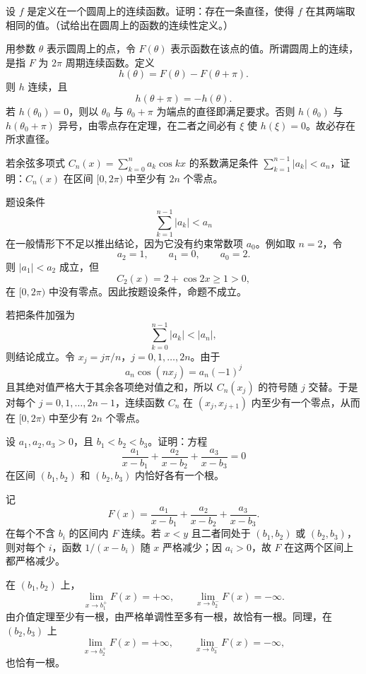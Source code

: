 \begin{xexercise}[2]
设 $f$ 是定义在一个圆周上的连续函数。证明：存在一条直径，使得 $f$ 在其两端取相同的值。（试给出在圆周上的函数的连续性定义。）
\end{xexercise}
\begin{xsolution}
用参数 $\theta$ 表示圆周上的点，令 $F(\theta)$ 表示函数在该点的值。所谓圆周上的连续，是指 $F$ 为 $2\pi$ 周期连续函数。定义
\[
 h(\theta)=F(\theta)-F(\theta+\pi).
\]
则 $h$ 连续，且
\[
 h(\theta+\pi)=-h(\theta).
\]
若 $h(\theta_0)=0$，则以 $\theta_0$ 与 $\theta_0+\pi$ 为端点的直径即满足要求。否则 $h(\theta_0)$ 与 $h(\theta_0+\pi)$ 异号，由零点存在定理，在二者之间必有 $\xi$ 使 $h(\xi)=0$。故必存在所求直径。
\end{xsolution}


\begin{xexercise}[3]
若余弦多项式 $C_n(x)=\sum_{k=0}^n a_k\cos kx$ 的系数满足条件 $\sum_{k=1}^{n-1}|a_k|<a_n$，证明：$C_n(x)$ 在区间 $[0,2\pi)$ 中至少有 $2n$ 个零点。
\end{xexercise}
\begin{xsolution}
题设条件
\[
 \sum_{k=1}^{n-1}|a_k|<a_n
\]
在一般情形下不足以推出结论，因为它没有约束常数项 $a_0$。例如取 $n=2$，令
\[
 a_2=1,\qquad a_1=0,\qquad a_0=2.
\]
则 $|a_1|<a_2$ 成立，但
\[
 C_2(x)=2+\cos2x\ge1>0,
\]
在 $[0,2\pi)$ 中没有零点。因此按题设条件，命题不成立。

若把条件加强为
\[
 \sum_{k=0}^{n-1}|a_k|<|a_n|,
\]
则结论成立。令 $x_j=j\pi/n$，$j=0,1,\ldots,2n$。由于
\[
 a_n\cos(nx_j)=a_n(-1)^j
\]
且其绝对值严格大于其余各项绝对值之和，所以 $C_n(x_j)$ 的符号随 $j$ 交替。于是对每个 $j=0,1,\ldots,2n-1$，连续函数 $C_n$ 在 $(x_j,x_{j+1})$ 内至少有一个零点，从而在 $[0,2\pi)$ 中至少有 $2n$ 个零点。
\end{xsolution}


\begin{xexercise}[4]
设 $a_1,a_2,a_3>0$，且 $b_1<b_2<b_3$。证明：方程
  \[
    \frac{a_1}{x-b_1}+\frac{a_2}{x-b_2}+\frac{a_3}{x-b_3}=0
  \]
  在区间 $(b_1,b_2)$ 和 $(b_2,b_3)$ 内恰好各有一个根。
\end{xexercise}
\begin{xsolution}
记
\[
 F(x)=\frac{a_1}{x-b_1}+\frac{a_2}{x-b_2}+\frac{a_3}{x-b_3}.
\]
在每个不含 $b_i$ 的区间内 $F$ 连续。若 $x<y$ 且二者同处于 $(b_1,b_2)$ 或 $(b_2,b_3)$，则对每个 $i$，函数 $1/(x-b_i)$ 随 $x$ 严格减少；因 $a_i>0$，故 $F$ 在这两个区间上都严格减少。

在 $(b_1,b_2)$ 上，
\[
 \lim_{x\to b_1^+}F(x)=+\infty,
 \qquad
 \lim_{x\to b_2^-}F(x)=-\infty.
\]
由介值定理至少有一根，由严格单调性至多有一根，故恰有一根。同理，在 $(b_2,b_3)$ 上
\[
 \lim_{x\to b_2^+}F(x)=+\infty,
 \qquad
 \lim_{x\to b_3^-}F(x)=-\infty,
\]
也恰有一根。
\end{xsolution}


